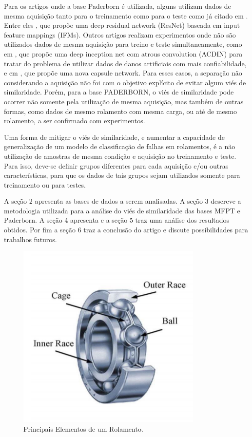 \documentclass[conference]{IEEEtran}
\begin{document}
Para os artigos onde a base Paderborn é utilizada, alguns utilizam dados de mesma aquisição tanto para o treinamento como para o teste como já citado em \cite{b5}.
Entre eles \cite{b10}, que propõe uma deep residual network (ResNet) baseada em input feature mappings (IFMs).
Outros artigos realizam experimentos onde não são utilizados dados de mesma aquisição para treino e teste simultaneamente, como em \cite{b11}, que propõe uma deep inception net com atrous convolution (ACDIN) para tratar do problema de utilizar dados de danos artificiais com mais confiabilidade, e em \cite{b12}, que propõe uma nova capsule network.
Para esses casos, a separação não considerando a aquisição não foi com o objetivo explícito de evitar algum viés de similaridade.
Porém, para a base PADERBORN, o viés de similaridade pode ocorrer não somente pela utilização de mesma aquisição, mas também de outras formas, como dados de mesmo rolamento com mesma carga, ou até de mesmo rolamento, a ser confirmado com experimentos.

Uma forma de mitigar o viés de similaridade, e aumentar a capacidade de generalização de um modelo de classificação de falhas em rolamentos, é a não utilização de amostras de mesma condição e aquisição no treinamento e teste.
Para isso, deve-se definir grupos diferentes para cada aquisição e/ou outras características, para que os dados de tais grupos sejam utilizados somente para treinamento ou para testes.

A seção 2 apresenta as bases de dados a serem analisadas.
A seção 3 descreve a metodologia utilizada para a análise do viés de similaridade das bases MFPT e Paderborn.
A seção 4 apresenta e a seção 5 traz uma análise dos resultados obtidos.
Por fim a seção 6 traz a conclusão do artigo e discute possibilidades para trabalhos futuros.

\begin{figure}[htbp]
\centerline{\includegraphics{fig1.png}}
\caption{Principais Elementos de um Rolamento.}
\label{fig1}
\end{figure}
\end{document}
